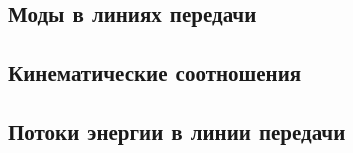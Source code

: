 \subsection{Моды в линиях передачи}

\subsection{Кинематические соотношения}

\subsection{Потоки энергии в линии передачи}